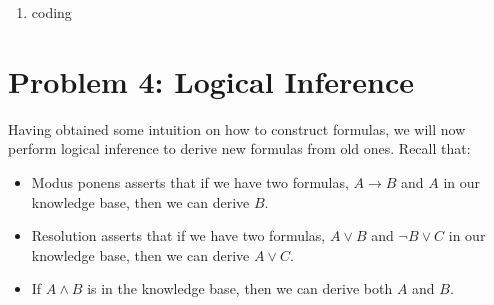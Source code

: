 \documentclass[10pt]{article}
\begin{document}
\begin{enumerate}[label=(\alph*)]

  \item coding

\end{enumerate}

\section*{\normalsize Problem 4: Logical Inference}

Having obtained some intuition on how to construct formulas, we will now perform logical inference to derive new formulas from old ones. Recall that:
\begin{itemize}

	\item Modus ponens asserts that if we have two formulas, $A \rightarrow B$ and $A$ in our knowledge base, then we can derive $B$.
	
	\item Resolution asserts that if we have two formulas, $A \vee B$ and $\neg B \vee C$ in our knowledge base, then we can derive $A \vee C$.
	
	\item If $A \wedge B$ is in the knowledge base, then we can derive both $A$ and $B$. 
	
\end{itemize}
\end{document}

